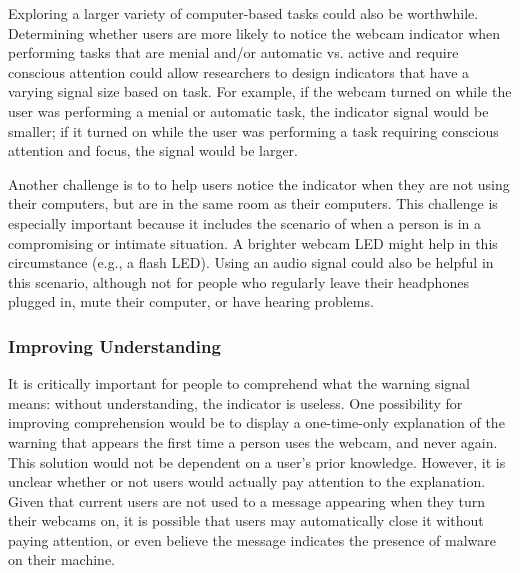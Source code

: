 \documentclass{sigchi}
\begin{document}
Exploring a larger variety of computer-based tasks could also be worthwhile. Determining whether users are more likely to notice the webcam indicator when performing tasks that are menial and/or automatic vs. active and require conscious attention could allow researchers to design indicators that have a varying signal size based on task. For example, if the webcam turned on while the user was performing a menial or automatic task, the indicator signal would be smaller; if it turned on while the user was performing a task requiring conscious attention and focus, the signal would be larger.

Another challenge is to to help users notice the indicator when they are not using their computers, but are in the same room as their computers. This challenge is especially important because it includes the scenario of when a person is in a compromising or intimate situation. A brighter webcam LED might help in this circumstance (e.g., a flash LED). Using an audio signal could also be helpful in this scenario, although not for people who regularly leave their headphones plugged in, mute their computer, or have hearing problems.



\subsubsection{Improving Understanding}
It is critically important for people to comprehend what the warning signal means: without understanding, the indicator is useless. One possibility for improving comprehension would be to display a one-time-only explanation of the warning that appears the first time a person uses the webcam, and never again. This solution would not be dependent on a user's prior knowledge. However, it is unclear whether or not users would actually pay attention to the explanation. Given that current users are not used to a message appearing when they turn their webcams on, it is possible that users may automatically close it without paying attention, or even believe the message indicates the presence of malware on their machine.
\end{document}

